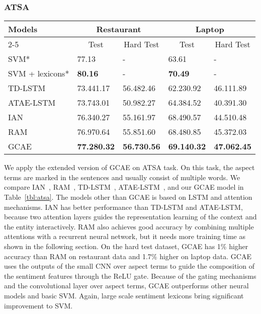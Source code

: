 \documentclass[11pt,a4paper]{article}
\begin{document}
\subsubsection{ATSA}
\begin{table*}[ht]
\centering
\begin{tabular}{l|ll|ll}
\hline
\multirow{2}{*}{Models} & \multicolumn{2}{c|}{Restaurant}   & \multicolumn{2}{c}{Laptop}             \\ \cline{2-5} 
& \multicolumn{1}{c}{Test} & \multicolumn{1}{c|}{Hard Test} & \multicolumn{1}{c}{Test} & \multicolumn{1}{c}{Hard Test}     \\ \hline
SVM*                  &  77.13            & -          &    63.61          & -                \\
SVM + lexicons*         &  \textbf{80.16}   & -          &  \textbf{70.49}   & -                \\ \hline
TD-LSTM               & 73.441.17    & 56.482.46    & 62.230.92    & 46.111.89   \\
ATAE-LSTM             & 73.743.01    & 50.982.27    & 64.384.52    & 40.391.30   \\
IAN                   & 76.340.27    & 55.161.97    & 68.490.57    & 44.510.48   \\
RAM                   & 76.970.64    & 55.851.60    & 68.480.85    & 45.372.03   \\
GCAE                  & \textbf{77.280.32}        & \textbf{56.730.56}         & \textbf{69.140.32}                      & \textbf{47.062.45}        \\ \hline
\end{tabular}
\caption{The accuracy of ATSA subtask on SemEval 2014 Task 4. `*': the results with SVM are retrieved from NRC-Canada~\cite{Kiritchenko:2014jw}}
\label{tbl:atsa}
\end{table*}
We apply the extended version of GCAE on ATSA task. On this task, the aspect terms are marked in the sentences and usually consist of multiple words.
We compare IAN~\cite{Ma:2017jo}, RAM~\cite{Chen:2017wv}, TD-LSTM~\cite{Tang:2016th}, ATAE-LSTM~\cite{Wang:2016tf}, and our GCAE model in Table~\ref{tbl:atsa}. The models other than GCAE is based on LSTM and attention mechanisms. 
IAN has better performance than TD-LSTM and ATAE-LSTM, because two attention layers guides the representation learning of the context and the entity interactively. RAM also achieves good accuracy by combining multiple attentions with a recurrent neural network, but it needs more training time as shown in the following section.
On the hard test dataset, GCAE has 1\% higher accuracy than RAM on restaurant data and 1.7\% higher on laptop data. 
GCAE uses the outputs of the small CNN over aspect terms to guide the composition of the sentiment features through the ReLU gate. Because of the gating mechanisms and the convolutional layer over aspect terms, GCAE outperforms other neural models and basic SVM. 
Again, large scale sentiment lexicons bring significant improvement to SVM.
\end{document}
